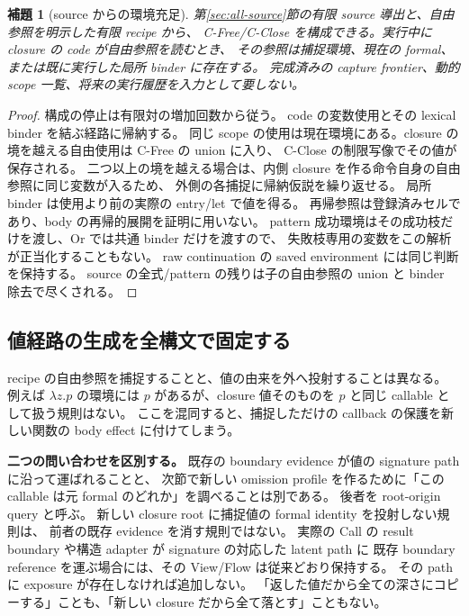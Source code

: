 \documentclass[11pt,a4paper]{article}
\newtheorem{lemma}[definition]{補題}
\begin{document}
\begin{lemma}[source からの環境充足]
\label{lem:closure-env}
第\ref{sec:all-source}節の有限 source 導出と、自由参照を明示した有限 recipe から、
C-Free/C-Close を構成できる。実行中に closure の code が自由参照を読むとき、
その参照は捕捉環境、現在の formal、または既に実行した局所 binder に存在する。
完成済みの capture frontier、動的 scope 一覧、将来の実行履歴を入力として要しない。
\end{lemma}
\begin{proof}
構成の停止は有限対の増加回数から従う。
code の変数使用とその lexical binder を結ぶ経路に帰納する。
同じ scope の使用は現在環境にある。closure の境を越える自由使用は C-Free の union に入り、
C-Close の制限写像でその値が保存される。
二つ以上の境を越える場合は、内側 closure を作る命令自身の自由参照に同じ変数が入るため、
外側の各捕捉に帰納仮説を繰り返せる。
局所 binder は使用より前の実際の entry/let で値を得る。
再帰参照は登録済みセルであり、body の再帰的展開を証明に用いない。
pattern 成功環境はその成功枝だけを渡し、Or では共通 binder だけを渡すので、
失敗枝専用の変数をこの解析が正当化することもない。
raw continuation の saved environment には同じ判断を保持する。
source の全式/pattern の残りは子の自由参照の union と binder 除去で尽くされる。
\end{proof}

\subsection{値経路の生成を全構文で固定する}

recipe の自由参照を捕捉することと、値の由来を外へ投射することは異なる。
例えば \(\lambda z.p\) の環境には \(p\) があるが、closure 値そのものを
\(p\) と同じ callable として扱う規則はない。
ここを混同すると、捕捉しただけの callback の保護を新しい関数の body effect に付けてしまう。

\textbf{二つの問い合わせを区別する。}
既存の boundary evidence が値の signature path に沿って運ばれることと、
次節で新しい omission profile を作るために「この callable は元 formal のどれか」を調べることは別である。
後者を root-origin query と呼ぶ。
新しい closure root に捕捉値の formal identity を投射しない規則は、
前者の既存 evidence を消す規則ではない。
実際の Call の result boundary や構造 adapter が signature の対応した latent path に
既存 boundary reference を運ぶ場合には、その View/Flow は従来どおり保持する。
その path に exposure が存在しなければ追加しない。
「返した値だから全ての深さにコピーする」ことも、「新しい closure だから全て落とす」こともない。
\end{document}
